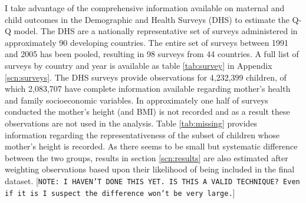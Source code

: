 \documentclass{article}[11pt,subeqn]
\begin{document}
\begin{spacing}{1.25}
I take advantage of the comprehensive information available on maternal and child outcomes in the Demographic and Health Surveys (DHS) 
to estimate the Q-Q model.  The DHS are a nationally representative set of surveys administered in approximately 90 developing countries.  
The entire set of surveys between 1991 and 2005 has been pooled, resulting in 98 surveys from 44 countries.  A full list of surveys by 
country and year is available as table \ref{tab:survey} in Appendix \ref{scn:surveys}.  The DHS surveys provide observations for 4,232,399 
children, of which 2,083,707 have complete information available regarding mother's health and family socioeconomic variables.  In 
approximately one half of surveys conducted the mother's height (and BMI) is not recorded and as a result these observations are not used 
in the analysis. Table \ref{tab:missing} provides information regarding the representativeness of the subset of children whose mother's 
height is recorded.  As there seems to be small but systematic difference between the two groups, results in section \ref{scn:results} 
are also estimated after weighting observations based upon their likelihood of being included in the final dataset. [\texttt{NOTE: I 
HAVEN'T DONE THIS YET.  IS THIS A VALID TECHNIQUE?  Even if it is I suspect the difference won't be very large.}]


\end{spacing}
\end{document}
